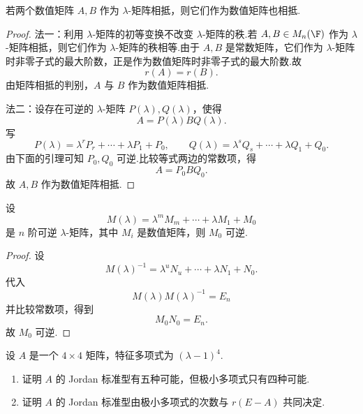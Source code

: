 \begin{problem}[65]
	若两个数值矩阵 $A,B$ 作为 $\lambda$-矩阵相抵，则它们作为数值矩阵也相抵.
\end{problem}

\begin{proof}
	法一：利用 $\lambda$-矩阵的初等变换不改变 $\lambda$-矩阵的秩.若 $A,B\in M_n(\F)$ 作为 $\lambda$-矩阵相抵，则它们作为 $\lambda$-矩阵的秩相等.由于 $A,B$ 是常数矩阵，它们作为 $\lambda$-矩阵时非零子式的最大阶数，正是作为数值矩阵时非零子式的最大阶数.故
	\[
	r(A)=r(B).
	\]
	由矩阵相抵的判别，$A$ 与 $B$ 作为数值矩阵相抵.
	
	法二：设存在可逆的 $\lambda$-矩阵 $P(\lambda),Q(\lambda)$，使得
	\[
	A=P(\lambda)BQ(\lambda).
	\]
	写
	\[
	P(\lambda)=\lambda^rP_r+\cdots+\lambda P_1+P_0,
	\qquad
	Q(\lambda)=\lambda^sQ_s+\cdots+\lambda Q_1+Q_0.
	\]
	由下面的引理可知 $P_0,Q_0$ 可逆.比较等式两边的常数项，得
	\[
	A=P_0BQ_0.
	\]
	故 $A,B$ 作为数值矩阵相抵.
\end{proof}

\begin{lemma}
	设
	\[
	M(\lambda)=\lambda^mM_m+\cdots+\lambda M_1+M_0
	\]
	是 $n$ 阶可逆 $\lambda$-矩阵，其中 $M_i$ 是数值矩阵，则 $M_0$ 可逆.
\end{lemma}

\begin{proof}
	设
	\[
	M(\lambda)^{-1}=\lambda^uN_u+\cdots+\lambda N_1+N_0.
	\]
	代入
	\[
	M(\lambda)M(\lambda)^{-1}=E_n
	\]
	并比较常数项，得到
	\[
	M_0N_0=E_n.
	\]
	故 $M_0$ 可逆.
\end{proof}

\begin{problem}[85]
	设 $A$ 是一个 $4\times4$ 矩阵，特征多项式为 $(\lambda-1)^4$.
	\begin{enumerate}
		\item 证明 $A$ 的 Jordan 标准型有五种可能，但极小多项式只有四种可能.
		\item 证明 $A$ 的 Jordan 标准型由极小多项式的次数与 $r(E-A)$ 共同决定.
	\end{enumerate}
\end{problem}

